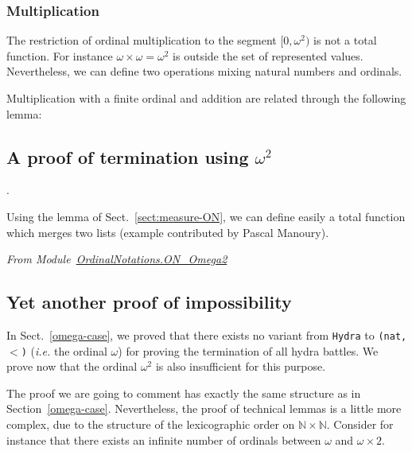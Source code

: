 

\subsubsection{Multiplication}

The restriction of ordinal multiplication to the segment $[0,\omega^2)$ is not a total function.
For instance $\omega\times\omega= \omega^2$ is outside the set of represented values.
Nevertheless, we can define two operations mixing natural numbers and ordinals.





Multiplication with a finite ordinal and addition are related through the following lemma:

 

\subsection{A proof of termination using \texorpdfstring{$\omega^2$}{omega^2}} 
\label{sect:merge-example}.

Using the lemma of Sect.~\vref{sect:measure-ON}, we can define easily a total function which merges two lists (example contributed by Pascal Manoury).


\vspace{4pt}
\noindent\emph{From Module~\href{../theories/html/hydras.OrdinalNotations.ON_Omega2.html}{OrdinalNotations.ON\_Omega2}}


 

\subsection{Yet another  proof of impossibility}
\label{omega2-case}

In Sect.~\vref{omega-case}, we proved that there exists no variant from \texttt{Hydra} to \texttt{(nat,$<$)}
(\emph{i.e.} the ordinal $\omega$) for proving the termination of all hydra battles.
We  prove now that  the ordinal $\omega^2$ is also insufficient for this purpose. 

The proof we are going to comment has exactly the same structure as in Section~\ref{omega-case}.
 Nevertheless, the proof of technical  lemmas is a little more complex, due to 
 the structure of the lexicographic order on $\mathbb{N}\times\mathbb{N}$. 
Consider for instance that there exists an infinite number of ordinals  between
$\omega$ and $\omega\times 2$.



